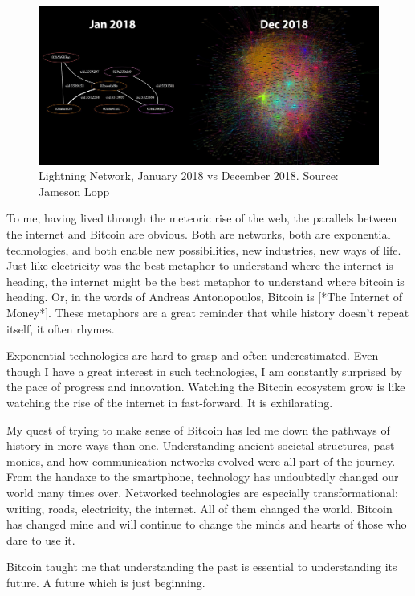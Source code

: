 \begin{figure}
  \includegraphics{assets/images/lnd-growth-lopp-black.png}
  \caption{Lightning Network, January 2018 vs December 2018. Source: Jameson Lopp}
  \label{fig:lnd-growth-lopp-black.png}
\end{figure}

To me, having lived through the meteoric rise of the web, the parallels
between the internet and Bitcoin are obvious. Both are networks, both
are exponential technologies, and both enable new possibilities, new
industries, new ways of life. Just like electricity was the best
metaphor to understand where the internet is heading, the internet might
be the best metaphor to understand where bitcoin is heading. Or, in the
words of Andreas Antonopoulos, Bitcoin is [*The Internet of Money*].
These metaphors are a great reminder that while history doesn't repeat
itself, it often rhymes.

Exponential technologies are hard to grasp and often underestimated.
Even though I have a great interest in such technologies, I am
constantly surprised by the pace of progress and innovation. Watching
the Bitcoin ecosystem grow is like watching the rise of the internet in
fast-forward. It is exhilarating.

My quest of trying to make sense of Bitcoin has led me down the pathways
of history in more ways than one. Understanding ancient societal
structures, past monies, and how communication networks evolved were all
part of the journey. From the handaxe to the smartphone, technology has
undoubtedly changed our world many times over. Networked technologies
are especially transformational: writing, roads, electricity, the
internet. All of them changed the world. Bitcoin has changed mine and
will continue to change the minds and hearts of those who dare to use
it.

Bitcoin taught me that understanding the past is essential to
understanding its future. A future which is just beginning.

